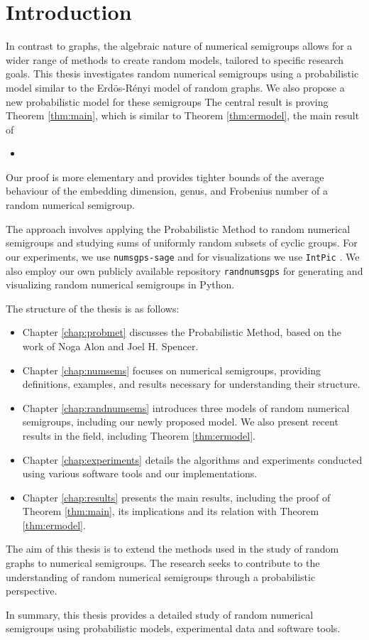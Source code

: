 \chapter{Introduction}\label{chap:intro}


In contrast to graphs, the algebraic nature of numerical semigroups allows for a wider range of methods to create random models, tailored to specific research goals. This thesis investigates random numerical semigroups using a probabilistic model similar to the Erdös-Rényi model of random graphs. We also propose a new probabilistic model for these semigroups  The central result is proving Theorem \ref{thm:main}, which is similar to Theorem \ref{thm:ermodel}, the main result of 
\begin{itemize}
    \item {}
\end{itemize}
Our proof is more elementary and provides tighter bounds of the average behaviour of the embedding dimension, genus, and Frobenius number of a random numerical semigroup. 

The approach involves applying the Probabilistic Method to random numerical semigroups and studying sums of uniformly random subsets of cyclic groups. For our experiments, we use \verb|numsgps-sage| \cite[O'Neill]{oneill2018}\cite[Delgado]{delgado2015numericalsgps} and for visualizations we use \verb|IntPic| \cite[Delgado]{delgado2013intpic}. We also employ our own publicly available repository \verb|randnumsgps| \cite{morales2023} for generating and visualizing random numerical semigroups in Python.

The structure of the thesis is as follows:

\begin{itemize}
    \item Chapter \ref{chap:probmet} discusses the Probabilistic Method, based on the work of Noga Alon and Joel H. Spencer.
    \item Chapter \ref{chap:numsems} focuses on numerical semigroups, providing definitions, examples, and results necessary for understanding their structure.
    \item Chapter \ref{chap:randnumsems} introduces three models of random numerical semigroups, including our newly proposed model. We also present recent results in the field, including Theorem \ref{thm:ermodel}. 
    \item Chapter \ref{chap:experiments} details the algorithms and experiments conducted using various software tools and our implementations.
    \item Chapter \ref{chap:results} presents the main results, including the proof of Theorem \ref{thm:main}, its implications and its relation with Theorem \ref{thm:ermodel}.
\end{itemize}

The aim of this thesis is to extend the methods used in the study of random graphs to numerical semigroups. The research seeks to contribute to the understanding of random numerical semigroups through a probabilistic perspective.

In summary, this thesis provides a detailed study of random numerical semigroups using probabilistic models, experimental data and software tools.